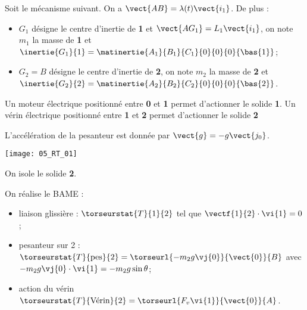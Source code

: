 \normaltrue
\correctiontrue


\setcounter{question}{0}%
\ifcorrection
\else
{}
\fi

\ifprof
\else
Soit le mécanisme suivant. On a $\vect{AB}=\lambda(t)\vect{i_1}$. De plus :
\begin{itemize}
\item $G_1$ désigne le centre d'inertie de \textbf{1} et $\vect{AG_1}=L_1\vect{i_1}$, on note $m_1$ la masse de \textbf{1} et $\inertie{G_1}{1}=\matinertie{A_1}{B_1}{C_1}{0}{0}{0}{\bas{1}}$; 
\item $G_2=B$ désigne le centre d'inertie de \textbf{2}, on note $m_2$ la masse de \textbf{2} et $\inertie{G_2}{2}=\matinertie{A_2}{B_2}{C_2}{0}{0}{0}{\bas{2}}$.
\end{itemize}


Un moteur électrique positionné entre \textbf{0} et \textbf{1} permet d'actionner le solide \textbf{1}.
Un vérin électrique positionné entre \textbf{1} et \textbf{2} permet d'actionner le solide \textbf{2}

L'accélération de la pesanteur est donnée par $\vect{g}=-g\vect{j_0}$.

\begin{marginfigure}
\texttt{[image: 05\_RT\_01]}
\end{marginfigure}
\fi

\ifprof

On isole le solide \textbf{2}.

On réalise le BAME : 
\begin{itemize}
\item liaison glissière : $\torseurstat{T}{1}{2}$ tel que $\vectf{1}{2}\cdot\vi{1} = 0$;
\item pesanteur sur 2 : $\torseurstat{T}{\text{pes}}{2} = \torseurl{-m_2 g \vj{0}}{\vect{0}}{B}$ avec $-m_2 g \vj{0} \cdot \vi{1} = -m_2 g\sin \theta$;
\item action du vérin $\torseurstat{T}{\text{Vérin}}{2} =  \torseurl{F_v \vi{1}}{\vect{0}}{A}$.
\end{itemize}

